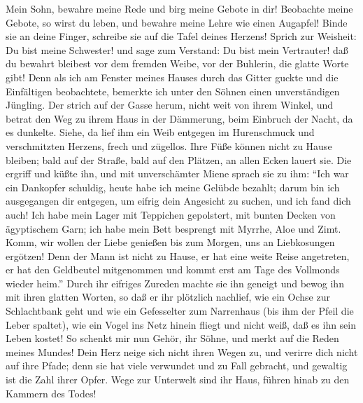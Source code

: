  Mein Sohn, bewahre meine Rede und birg meine Gebote in
dir!  Beobachte meine Gebote, so wirst du leben, und
bewahre meine Lehre wie einen Augapfel!  Binde sie an
deine Finger, schreibe sie auf die Tafel deines Herzens! 
Sprich zur Weisheit: Du bist meine Schwester! und sage zum Verstand: Du
bist mein Vertrauter!  daß du bewahrt bleibest vor dem
fremden Weibe, vor der Buhlerin, die glatte Worte gibt! 
Denn als ich am Fenster meines Hauses durch das Gitter guckte
 und die Einfältigen beobachtete, bemerkte ich unter den
Söhnen einen unverständigen Jüngling.  Der strich auf der
Gasse herum, nicht weit von ihrem Winkel, und betrat den Weg zu ihrem
Haus  in der Dämmerung, beim Einbruch der Nacht, da es
dunkelte.  Siehe, da lief ihm ein Weib entgegen im
Hurenschmuck und verschmitzten Herzens,  frech und
zügellos. Ihre Füße können nicht zu Hause bleiben;  bald
auf der Straße, bald auf den Plätzen, an allen Ecken lauert sie.
 Die ergriff und küßte ihn, und mit unverschämter Miene
sprach sie zu ihm:  ``Ich war ein Dankopfer schuldig,
heute habe ich meine Gelübde bezahlt;  darum bin ich
ausgegangen dir entgegen, um eifrig dein Angesicht zu suchen, und ich
fand dich auch!  Ich habe mein Lager mit Teppichen
gepolstert, mit bunten Decken von ägyptischem Garn;  ich
habe mein Bett besprengt mit Myrrhe, Aloe und Zimt. 
Komm, wir wollen der Liebe genießen bis zum Morgen, uns an Liebkosungen
ergötzen!  Denn der Mann ist nicht zu Hause, er hat eine
weite Reise angetreten,  er hat den Geldbeutel
mitgenommen und kommt erst am Tage des Vollmonds wieder heim.''
 Durch ihr eifriges Zureden machte sie ihn geneigt und
bewog ihn mit ihren glatten Worten,  so daß er ihr
plötzlich nachlief, wie ein Ochse zur Schlachtbank geht und wie ein
Gefesselter zum Narrenhaus  (bis ihm der Pfeil die Leber
spaltet), wie ein Vogel ins Netz hinein fliegt und nicht weiß, daß es
ihn sein Leben kostet!  So schenkt mir nun Gehör, ihr
Söhne, und merkt auf die Reden meines Mundes!  Dein Herz
neige sich nicht ihren Wegen zu, und verirre dich nicht auf ihre Pfade;
 denn sie hat viele verwundet und zu Fall gebracht, und
gewaltig ist die Zahl ihrer Opfer.  Wege zur Unterwelt
sind ihr Haus, führen hinab zu den Kammern des Todes!

